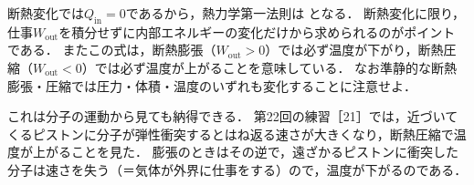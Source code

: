 断熱変化では$Q_{\mathrm{in}}=0$であるから，熱力学第一法則は
となる．
{\gtfamily 断熱変化に限り，仕事$W_{\mathrm{out}}$を積分せずに内部エネルギーの変化だけから求められる}のがポイントである．
またこの式は，{\gtfamily 断熱膨張（$W_{\mathrm{out}}>0$）では必ず温度が下がり，断熱圧縮（$W_{\mathrm{out}}<0$）では必ず温度が上がる}ことを意味している．
なお{\gtfamily 準静的な}断熱膨張・圧縮では圧力・体積・温度のいずれも変化することに注意せよ．

これは分子の運動から見ても納得できる．
第22回の練習［21］では，近づいてくるピストンに分子が弾性衝突するとはね返る速さが大きくなり，断熱圧縮で温度が上がることを見た．
膨張のときはその逆で，遠ざかるピストンに衝突した分子は速さを失う（＝気体が外界に仕事をする）ので，温度が下がるのである．

